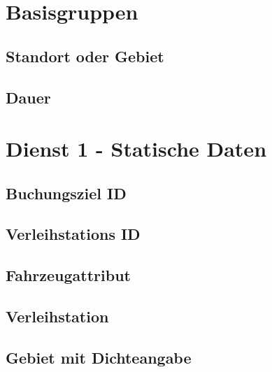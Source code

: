 \section{Basisgruppen}
\label{sec:Datenmodell:Baisgruppen}

\subsection*{Standort oder Gebiet}



\subsection*{Dauer}



\section{Dienst 1 - Statische Daten}
\label{sec:Datenmodell:Dienst1}

\subsection*{Buchungsziel ID}



\subsection*{Verleihstations ID}



\subsection*{Fahrzeugattribut}



\subsection*{Verleihstation}



\subsection*{Gebiet mit Dichteangabe}




